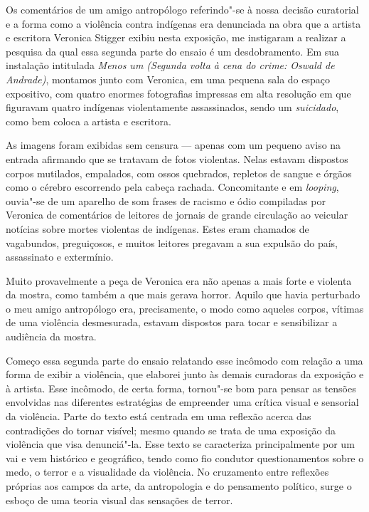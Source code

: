 Os comentários de um amigo antropólogo referindo"-se à nossa decisão
curatorial e a forma como a violência contra indígenas era denunciada na
obra que a artista e escritora Veronica Stigger exibiu nesta exposição,
me instigaram a realizar a pesquisa da qual essa segunda parte do ensaio
é um desdobramento. Em sua instalação intitulada \emph{Menos um (Segunda
volta à cena do crime: Oswald de Andrade)}, montamos junto com Veronica,
em uma pequena sala do espaço expositivo, com quatro enormes fotografias
impressas em alta resolução em que figuravam quatro indígenas
violentamente assassinados, sendo um \emph{suicidado}, como bem coloca a
artista e escritora.

As imagens foram exibidas sem censura --- apenas com um pequeno aviso na
entrada afirmando que se tratavam de fotos violentas. Nelas estavam
dispostos corpos mutilados, empalados, com ossos quebrados, repletos de
sangue e órgãos como o cérebro escorrendo pela cabeça rachada.
Concomitante e em \emph{looping}, ouvia"-se de um aparelho de som frases
de racismo e ódio compiladas por Veronica de comentários de leitores de
jornais de grande circulação ao veicular notícias sobre mortes violentas
de indígenas. Estes eram chamados de vagabundos, preguiçosos, e muitos
leitores pregavam a sua expulsão do país, assassinato e extermínio.

Muito provavelmente a peça de Veronica era não apenas a mais forte e
violenta da mostra, como também a que mais gerava horror. Aquilo que
havia perturbado o meu amigo antropólogo era, precisamente, o modo como
aqueles corpos, vítimas de uma violência desmesurada, estavam dispostos
para tocar e sensibilizar a audiência da mostra.

Começo essa segunda parte do ensaio relatando esse incômodo com relação
a uma forma de exibir a violência, que elaborei junto às demais
curadoras da exposição e à artista. Esse incômodo, de certa forma,
tornou"-se bom para pensar as tensões envolvidas nas diferentes
estratégias de empreender uma crítica visual e sensorial da violência.
Parte do texto está centrada em uma reflexão acerca das contradições do
tornar visível; mesmo quando se trata de uma exposição da violência que
visa denunciá"-la. Esse texto se caracteriza principalmente por um vai e
vem histórico e geográfico, tendo como fio condutor questionamentos
sobre o medo, o terror e a visualidade da violência. No cruzamento entre
reflexões próprias aos campos da arte, da antropologia e do pensamento
político, surge o esboço de uma teoria visual das sensações de terror.

